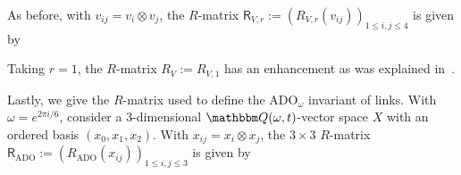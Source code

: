 \documentclass[12pt,reqno]{amsart}
\theoremstyle{definition}
\def\BQ{\mathbbm Q}
\def\be{\begin{equation}}
\def\ee{\end{equation}}
\def\End{\mathrm{End}}
\def\ADO{\mathrm{ADO}}
\begin{document}
As before, with $v_{ij}=v_i \otimes v_j$, the $R$-matrix 
$\mathsf{R}_{V,r}:=(R_{V,r}(v_{ij}))_{1 \leq i,j \leq 4}$ is given by
\begin{center}
\small
{}
\end{center} 
\vspace{0.25cm}

Taking $r=1$, the $R$-matrix $R_V:=R_{V,1}$ has an enhancement as was explained
in~\cite[Sec.3]{GHKST}. 

Lastly, we give the $R$-matrix used to define the $\ADO_\omega$ invariant of links.
With $\omega = e^{2\pi i/6}$, consider a 3-dimensional $\BQ(\omega,t)$-vector
space $X$ with an ordered basis $(x_0, x_1, x_2)$.
%
With $x_{ij}=x_i \otimes x_j$, the $3 \times 3$ $R$-matrix
$\mathsf{R}_{\ADO}:=(R_{\ADO}(x_{ij}))_{1 \leq i,j \leq 3}$ is given by
\end{document}

